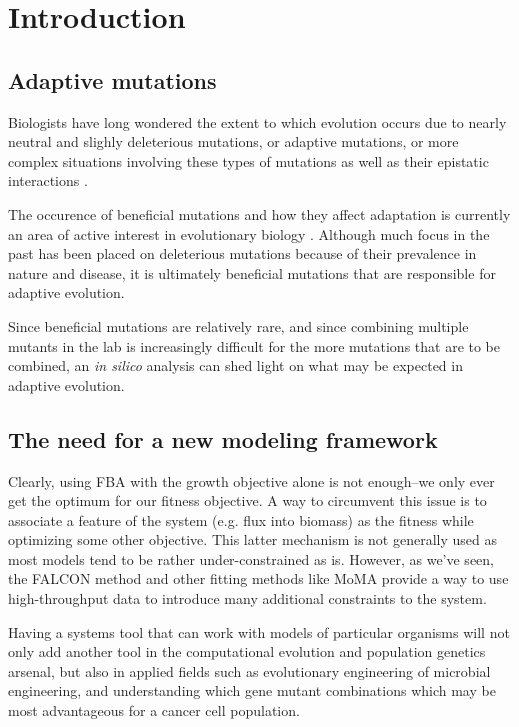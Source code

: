 \section{Introduction}

\subsection{Adaptive mutations}

Biologists have long wondered the extent to which evolution occurs due
to nearly neutral and slighly deleterious mutations, or adaptive
mutations, or more complex situations involving these types of
mutations as well as their epistatic interactions \citep{Kimura1989, Orr2003}.

The occurence of beneficial mutations and how they affect adaptation
is currently an area of active interest in evolutionary biology
\citep{Chou2011, Weinreich2006}. Although much focus in the past
has been placed on deleterious mutations because of their prevalence
in nature and disease, it is ultimately beneficial mutations that
are responsible for adaptive evolution.
 
Since beneficial mutations are relatively rare, and since
combining multiple mutants in the lab is increasingly difficult for
the more mutations that are to be combined, an \textit{in silico}
analysis can shed light on what may be expected in adaptive
evolution.

\subsection{The need for a new modeling framework}
Clearly, using FBA with the growth objective alone is not enough--we
only ever get the optimum for our fitness objective.  A way to
circumvent this issue is to associate a feature of the system
(e.g. flux into biomass) as the fitness while optimizing some other
objective. This latter mechanism is not generally used as most models
tend to be rather under-constrained as is. However, as we've seen, the
FALCON method 
and other fitting methods like MoMA provide a
way to use high-throughput data to introduce many additional
constraints to the system.

Having a systems tool that can work with models of particular organisms
will not only add another tool in the computational evolution and
population genetics arsenal, but also in applied fields such as
evolutionary engineering of microbial engineering, and understanding
which gene mutant combinations which may be most advantageous for
a cancer cell population.

